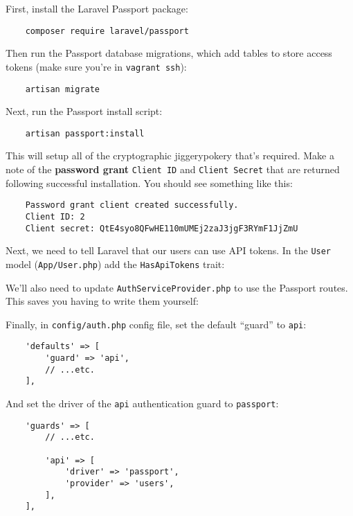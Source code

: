 First, install the Laravel Passport package:

\begin{verbatim}
    composer require laravel/passport
\end{verbatim}

Then run the Passport database migrations, which add tables to store access tokens (make sure you're in \texttt{vagrant ssh}):

\begin{verbatim}
    artisan migrate
\end{verbatim}

Next, run the Passport install script:

\begin{verbatim}
    artisan passport:install
\end{verbatim}

This will setup all of the cryptographic jiggerypokery that's required. Make a note of the \textbf{password grant} \texttt{Client ID} and \texttt{Client Secret} that are returned following successful installation. You should see something like this:

\begin{verbatim}
    Password grant client created successfully.
    Client ID: 2
    Client secret: QtE4syo8QFwHE110mUMEj2zaJ3jgF3RYmF1JjZmU
\end{verbatim}

Next, we need to tell Laravel that our users can use API tokens. In the \texttt{User} model (\texttt{App/User.php}) add the \texttt{HasApiTokens} trait:



We'll also need to update \texttt{AuthServiceProvider.php} to use the Passport routes. This saves you having to write them yourself:



Finally, in \texttt{config/auth.php} config file, set the default ``guard'' to \texttt{api}:

\begin{verbatim}
    'defaults' => [
        'guard' => 'api',
        // ...etc.
    ],
\end{verbatim}

And set the driver of the \texttt{api} authentication guard to \texttt{passport}:

\begin{verbatim}
    'guards' => [
        // ...etc.

        'api' => [
            'driver' => 'passport',
            'provider' => 'users',
        ],
    ],
\end{verbatim}

